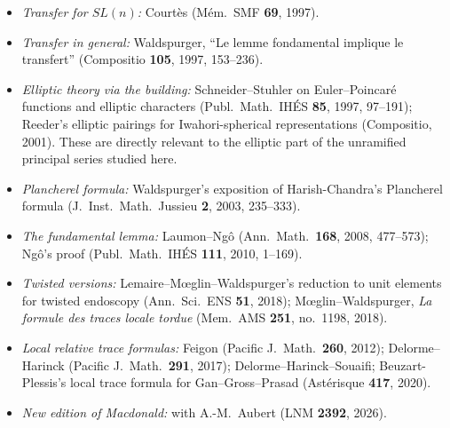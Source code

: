 \documentclass[11pt]{article}
\begin{document}
\begin{itemize}
\item \emph{Transfer for $SL(n)$:} Court\`es (M\'em.\ SMF \textbf{69}, 1997).
\item \emph{Transfer in general:} Waldspurger, ``Le lemme fondamental implique le transfert'' (Compositio \textbf{105}, 1997, 153--236).
\item \emph{Elliptic theory via the building:} Schneider--Stuhler on Euler--Poincar\'e functions and elliptic characters (Publ.\ Math.\ IH\'ES \textbf{85}, 1997, 97--191); Reeder's elliptic pairings for Iwahori-spherical representations (Compositio, 2001). These are directly relevant to the elliptic part of the unramified principal series studied here.
\item \emph{Plancherel formula:} Waldspurger's exposition of Harish-Chandra's Plancherel formula (J.\ Inst.\ Math.\ Jussieu \textbf{2}, 2003, 235--333).
\item \emph{The fundamental lemma:} Laumon--Ng\^o (Ann.\ Math.\ \textbf{168}, 2008, 477--573); Ng\^o's proof (Publ.\ Math.\ IH\'ES \textbf{111}, 2010, 1--169).
\item \emph{Twisted versions:} Lemaire--M\oe glin--Waldspurger's reduction to unit elements for twisted endoscopy (Ann.\ Sci.\ ENS \textbf{51}, 2018); M\oe glin--Waldspurger, \emph{La formule des traces locale tordue} (Mem.\ AMS \textbf{251}, no.~1198, 2018).
\item \emph{Local relative trace formulas:} Feigon (Pacific J.\ Math.\ \textbf{260}, 2012); Delorme--Harinck (Pacific J.\ Math.\ \textbf{291}, 2017); Delorme--Harinck--Souaifi; Beuzart-Plessis's local trace formula for Gan--Gross--Prasad (Ast\'erisque \textbf{417}, 2020).
\item \emph{New edition of Macdonald:} with A.-M.~Aubert (LNM \textbf{2392}, 2026).
\end{itemize}
\end{document}
